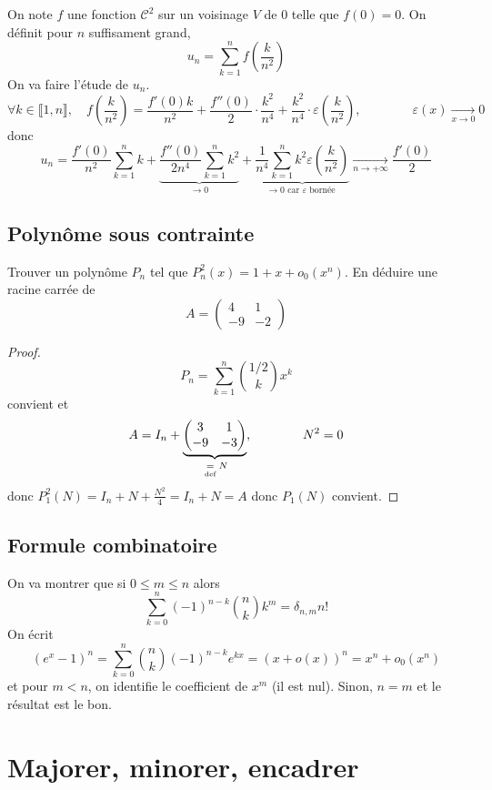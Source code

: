 On note $f$ une fonction $\mathcal C^2$ sur un voisinage $V$ de $0$ telle que $f(0)=0$. On définit pour $n$ suffisament grand, \[
    u_n=\sum_{k=1}^nf\left(\frac{k}{n^2}\right)
\]
On va faire l'étude de $u_n$. \[
    \forall k\in\llbracket 1, n\rrbracket, \quad f \left( \frac{k}{n^2} \right)=\frac{f'(0)k}{n^2}+\frac{f''(0)}{2}\cdot \frac {k^2}{n^4}+\frac {k^2}{n^4}\cdot \varepsilon \left( \frac{k}{n^2} \right), \qquad \qquad \varepsilon (x)\xrightarrow[x\to0]{}0
\]
donc \[
    u_n=\frac{f'(0)}{n^2}\sum_{k=1}^nk+\underbrace{\frac{f''(0)}{2n^4}\sum_{k=1}^nk^2}_{\longrightarrow 0}+\underbrace{\frac1{n^4}\sum_{k=1}^nk^2\varepsilon \left( \frac k{n^2} \right)}_{\longrightarrow 0\text{ car }\varepsilon\text{ bornée }}\xrightarrow[n\to+\infty]{}\frac{f'(0)}2
\]

\subsection{Polynôme sous contrainte}

\begin{exo}
Trouver un polynôme $P_n$ tel que $P_n^2(x)=1+x+o_0(x^n)$. En déduire une racine carrée de \[
    A= \begin{pmatrix}
        4&1\\-9&-2
    \end{pmatrix}
\]
\end{exo}
\begin{proof}
    \[
        P_n=\sum_{k=1}^n\binom{1/2}{k}x^k
    \]
    convient et \[
        A=I_n+ \underbrace{\begin{pmatrix}
            3&1\\-9&-3
    \end{pmatrix}}_{\;\underset{\text{def}}=\; N},\qquad \qquad N^2=0
    \]
    donc $P_1^2(N)=I_n+N+\frac{N^2}4=I_n+N=A$ donc $P_1(N)$ convient.
\end{proof}

\subsection{Formule combinatoire}

On va montrer que si $0\leq m\leq n$ alors \[
    \sum_{k=0}^n(-1)^{n-k}\binom nkk^m=\delta_{n,m}n!
\]
On écrit \[
    (e^x-1)^n=\sum_{k=0}^n\binom nk (-1)^{n-k}e^{kx}=(x+o(x))^n=x^n+o_0(x^n)
\]
et pour $m<n$, on identifie le coefficient de $x^m$ (il est nul). Sinon, $n=m$ et le résultat est le bon.

\section{Majorer, minorer, encadrer}

